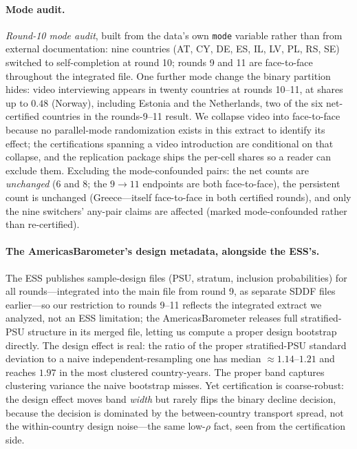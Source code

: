 \documentclass[12pt]{article}
\theoremstyle{definition}
\theoremstyle{remark}
\begin{document}
\paragraph{Mode audit.} \emph{Round-10 mode audit},
built from the data's own \texttt{mode} variable rather than from external
documentation: nine countries (AT, CY, DE, ES, IL, LV, PL, RS, SE) switched to
self-completion at round 10; rounds 9 and 11 are face-to-face throughout the
integrated file. One further mode change the binary partition hides: video
interviewing appears in twenty countries at rounds 10--11, at shares up to
$0.48$ (Norway), including Estonia and the Netherlands, two of the six
net-certified countries in the rounds-9--11 result. We collapse video into
face-to-face because no parallel-mode randomization exists in this extract to
identify its effect; the certifications spanning a video introduction are
conditional on that collapse, and the replication package ships the
per-cell shares so a reader can exclude them. Excluding the mode-confounded
pairs: the net counts are \emph{unchanged} ($6$ and $8$; the $9\to11$ endpoints
are both face-to-face), the persistent count is unchanged (Greece---itself
face-to-face in both certified rounds), and only the nine switchers' any-pair
claims are affected (marked mode-confounded rather than re-certified).

\paragraph{The AmericasBarometer's design metadata, alongside the ESS's.} The ESS
publishes sample-design files (PSU, stratum, inclusion probabilities) for all
rounds---integrated into the main file from round 9, as separate SDDF files
earlier---so our restriction to rounds 9--11 reflects the integrated extract we
analyzed, not an ESS limitation; the
AmericasBarometer releases full stratified-PSU structure in its merged file,
letting us compute a proper design bootstrap directly. The design effect is real: the ratio of the proper stratified-PSU
standard deviation to a naive independent-resampling one has median
$\approx1.14$--$1.21$ and reaches $1.97$ in the most clustered country-years. The
proper band captures clustering variance the naive bootstrap misses. Yet
certification is coarse-robust: the design effect moves band \emph{width} but rarely
flips the binary decline decision, because the decision is dominated by the
between-country transport spread, not the within-country design noise---the same
low-$\rho$ fact, seen from the certification side.
\end{document}
